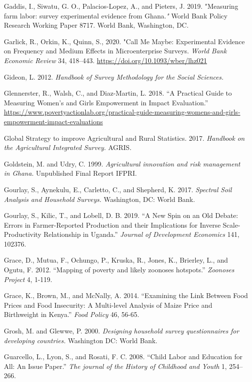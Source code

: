 \documentclass[
]{book}
\begin{document}
Gaddis, I., Siwatu, G. O., Palacios-Lopez, A., and Pieters, J. 2019. "Measuring farm labor: survey experimental evidence from Ghana.\emph{"} World Bank Policy Research Working Paper 8717. World Bank, Washington, DC.

Garlick, R., Orkin, K., Quinn, S., 2020. "Call Me Maybe: Experimental Evidence on Frequency and Medium Effects in Microenterprise Surveys. \emph{World Bank Economic Review} 34, 418--443. \url{https://doi.org/10.1093/wber/lhz021}

Gideon, L. 2012. \emph{Handbook of Survey Methodology for the Social Sciences.}

Glennerster, R., Walsh, C., and Diaz-Martin, L. 2018. ``A Practical Guide to Measuring Women's and Girls Empowerment in Impact Evaluation.'' \url{https://www.povertyactionlab.org/practical-guide-measuring-womens-and-girls-empowerment-impact-evaluations}

Global Strategy to improve Agricultural and Rural Statistics. 2017. \emph{Handbook on the Agricultural Integrated Survey.} AGRIS.

Goldstein, M. and Udry, C. 1999. \emph{Agricultural innovation and risk management in Ghana.} Unpublished Final Report IFPRI.

Gourlay, S., Aynekulu, E., Carletto, C., and Shepherd, K. 2017. \emph{Spectral Soil Analysis and Household Surveys.} Washington, DC: World Bank.

Gourlay, S., Kilic, T., and Lobell, D. B. 2019. ``A New Spin on an Old Debate: Errors in Farmer-Reported Production and their Implications for Inverse Scale-Productivity Relationship in Uganda.'' \emph{Journal of Development Economics} 141, 102376.

Grace, D., Mutua, F., Ochungo, P., Kruska, R., Jones, K., Brierley, L., and Ogutu, F. 2012. ``Mapping of poverty and likely zoonoses hotspots.'' \emph{Zoonoses Project} 4, 1-119.

Grace, K., Brown, M., and McNally, A. 2014. ``Examining the Link Between Food Prices and Food Insecurity: A Multi-level Analysis of Maize Price and Birthweight in Kenya.'' \emph{Food Policy} 46, 56-65.

Grosh, M. and Glewwe, P. 2000. \emph{Designing household survey questionnaires for developing countries.} Washington DC: World Bank.

Guarcello, L., Lyon, S., and Rosati, F. C. 2008. ``Child Labor and Education for All: An Issue Paper.'' \emph{The journal of the History of Childhood and Youth} 1, 254--266.
\end{document}
